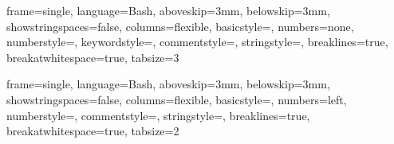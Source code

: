 \newcommand{\titleDocument}{Masterarbeit}
\newcommand{\subjectDocument}{StudyMap: Konzeption und Evaluierung eines
innovativen Studiengangfinders am Beispiel der OTH-Regensburg}
\newcommand*{\bildquelle}{
  \footnotesize Quelle:
}
\newcommand{\code}[1]{\noindent\ignorespaces\texttt{#1}}

\usepackage{listings}
\usepackage{color}



 {
  frame=single,
  language=Bash,
  aboveskip=3mm,
  belowskip=3mm,
  showstringspaces=false,
  columns=flexible,
  basicstyle={\small\ttfamily},
  numbers=none,
  numberstyle=\tiny\color{black},
  keywordstyle=\color{black},
  commentstyle=\color{black},
  stringstyle=\color{black},
  breaklines=true,
  breakatwhitespace=true,
  tabsize=3
}


 {
  frame=single,
  language=Bash,
  aboveskip=3mm,
  belowskip=3mm,
  showstringspaces=false,
  columns=flexible,
  basicstyle={\small\ttfamily},
  numbers=left,
  numberstyle=\tiny\color{mauve},
  commentstyle=\color{dkgreen},
  stringstyle=\color{dkgreen},
  breaklines=true,
  breakatwhitespace=true,
  tabsize=2
}
